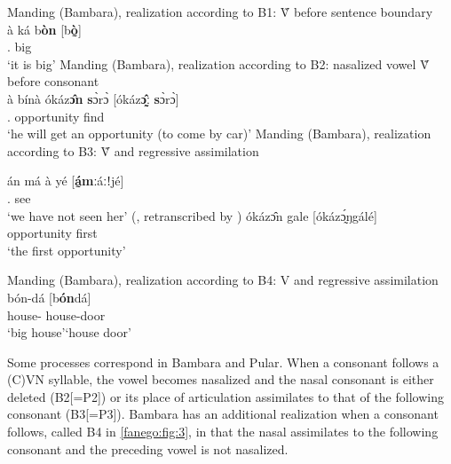 \documentclass[output=paper]{langscibook}
\begin{document}
\begin{exe}
    \ex\label{fanego:ex:27} Manding (Bambara), realization according to B1: Ṽ before sentence boundary \\
    \gll à ká {b\textbf{òn} [b\textbf{ò̰}]} \\
    \Third\SG{} \QUAL.\AFF{} big \\
    \glt ‘it is big’
    \ex\label{fanego:ex:28} Manding (Bambara), realization according to B2: nasalized vowel Ṽ before consonant \\
    \gll à bínà ókáz\textbf{ɔ̂n} {\textbf{s}ɔ̀rɔ̀ [ókáz\textbf{ɔ̰̂}ː \textbf{s}ɔ̀rɔ̀]} \\
    \Third\SG{} \FUT.\AFF{} opportunity find \\
    \glt ‘he will get an opportunity (to come by car)’ \citep[19]{diallo_assimilation_2003}
    \ex\label{fanego:ex:29} Manding (Bambara), realization according to B3: Ṽ and regressive assimilation
    \begin{xlist}
        \ex 
        \gll án má à yé [\textbf{á̰m}ːáːǃjé] \\
        \First\PL{} \PFV.\NEG{} \Third\SG{} see \\
        \glt ‘we have not seen her’ (\citealt[68]{sauvant_grammaire_1956}, retranscribed by \citealt[15]{diallo_assimilation_2003})
        \ex 
        \gll ókázɔ̂n {gale [ókázɔ̰́ŋgálé]} \\
        opportunity first \\
        \glt ‘the first opportunity’ \citep[22]{diallo_assimilation_2003}
    \end{xlist}
    \ex\label{fanego:ex:30} Manding (Bambara), realization according to B4: V and regressive assimilation \\
         {bón-dá [b\textbf{ón}dá]}\\
        house-\AUGM{} house-door \\
        \glt ‘big house’\qquad ‘house door’ \citep[17]{vydrin_cours_2019}
\end{exe}

\noindent
Some processes correspond in Bambara and Pular. When a consonant follows a (C)VN syllable, the vowel becomes nasalized and the nasal consonant is either deleted (B2[=P2]) or its place of articulation assimilates to that of the following consonant (B3[=P3]). Bambara has an additional realization when a consonant follows, called B4 in \autoref{fanego:fig:3}, in that the nasal assimilates to the following consonant and the preceding vowel is not nasalized.
\end{document}
